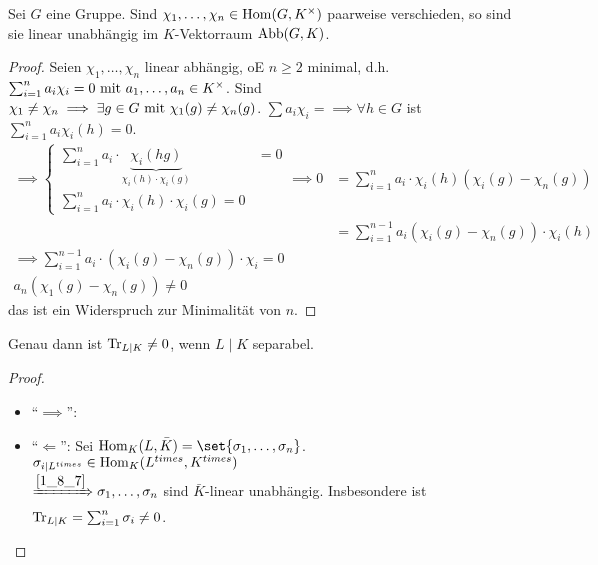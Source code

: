 \begin{theorem}
	Sei $G$ eine Gruppe. Sind $\chi_1, \dots, \chi_n \in \Hom(G, K^{\times})$ paarweise verschieden, so sind sie linear unabhängig im $K$-Vektorraum $\Abb(G,K)$.
\end{theorem}
\begin{proof} %
	Seien $\chi_1, \dots, \chi_n$ linear abhängig, oE $n \ge 2$ minimal, d.h. $\sum_{i=1}^n a_i \chi_i = 0 \mit a_1, \dots, a_n \in K^{\times}$. Sind $\chi_1 \neq \chi_n \implies \exists g \in G \mit \chi_1(g) \neq \chi_n(g)$. $\sum a_i \chi_i = \implies \forall h \in G$ ist $\sum_{i=1}^n a_i \chi_i (h) = 0$.
	\begin{align*}
		\implies \begin{cases}
			\sum_{i=1}^n a_i \cdot \underbrace{\chi_i (hg)}_{\chi_i(h)\cdot \chi_i(g)} &= 0\\
			\sum_{i=1}^n a_i \cdot \chi_i(h)\cdot \chi_i(g) = 0
		\end{cases}
		\implies 0 &= \sum_{i=1}^n a_i \cdot \chi_i(h)(\chi_i(g) - \chi_n(g))\\
		&= \sum_{i=1}^{n-1} a_i (\chi_i(g) - \chi_n(g))\cdot \chi_i(h)\\
		\implies \sum_{i=1}^{n-1} a_i \cdot (\chi_i(g) - \chi_n(g))\cdot \chi_i = 0\\
		a_n (\chi_1(g) - \chi_n(g)) \neq 0
	\end{align*}
	das ist ein Widerspruch zur Minimalität von $n$.
\end{proof}
\begin{conclusion}
	Genau dann ist $\Tr_{L \mid K} \neq 0$, wenn $L \mid K$ separabel.
\end{conclusion}
\begin{proof}
	\begin{itemize}
		\item ``$\implies$'': 
		\item ``$\Longleftarrow$'': Sei $\Hom_K(L, \bar{K}) = \set{\sigma_1, \dots, \sigma_n}$. $\sigma_{i \mid L^{times}} \in \Hom_K(L^{times}, K^{times})$\\
		$\xRightarrow{\cref{1_8_7}} \sigma_1,\dots, \sigma_n$ sind $\bar{K}$-linear unabhängig. Insbesondere ist $\Tr_{L \mid K} = \sum_{i=1}^n \sigma_i \neq 0$.
	\end{itemize}
\end{proof}